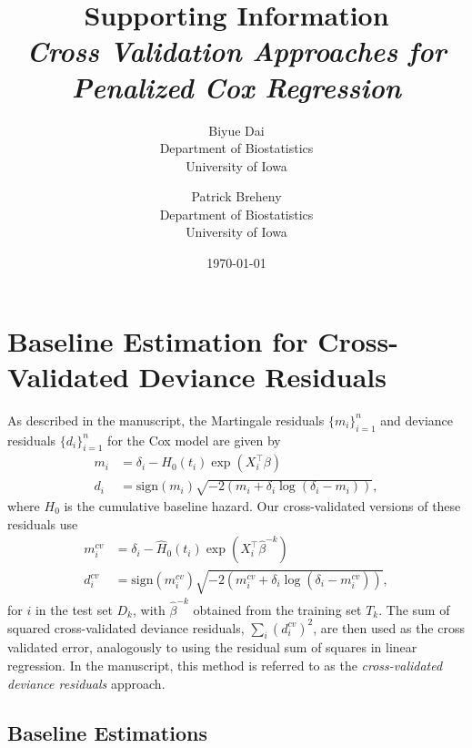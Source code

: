 \documentclass{article}
\title{Supporting Information\\
\textit{Cross Validation Approaches for Penalized Cox Regression}}
\author{Biyue Dai\\Department of Biostatistics\\University of Iowa
  \and
  Patrick Breheny\\Department of Biostatistics\\University of Iowa}
\date{\today}
\providecommand{\Tr}{^{\scriptscriptstyle\top}}
\begin{document}
\maketitle

\section{Baseline Estimation for Cross-Validated Deviance Residuals}

As described in the manuscript, the Martingale residuals $\{m_i\}_{i=1}^n$ and deviance residuals $\{d_i\}_{i=1}^n$ for the Cox model are given by
\begin{align*}
  m_{i} &= \delta_{i} - H_{0}(t_{i})\exp(X_i\Tr\beta) \\
  d_{i} &= \text{sign}(m_{i})\sqrt{-2(m_i + \delta_{i}\log(\delta_{i} - m_i))},
\end{align*}
where $H_0$ is the cumulative baseline hazard.  Our cross-validated versions of these residuals use
\begin{align*}
  m_{i}^{cv} &= \delta_{i} - \hat{H}_{0}(t_{i})\exp(X_i\Tr\hat\beta^{-k}) \\
  d_{i}^{cv} &= \text{sign}(m_{i}^{cv})\sqrt{-2(m_i^{cv} + \delta_{i}\log(\delta_{i} - m_i^{cv}))},
\end{align*}
for $i$ in the test set $D_k$, with $\hat{\beta}^{-k}$ obtained from the training set $T_k$.  The sum of squared cross-validated deviance residuals, $\sum_{i}(d_{i}^{cv})^2$, are then used as the cross validated error, analogously to using the residual sum of squares in linear regression.  In the manuscript, this method is referred to as the \emph{cross-validated deviance residuals} approach.


\subsection{Baseline Estimations}
\end{document}
